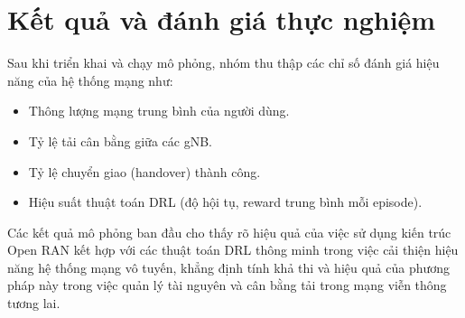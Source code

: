 \section{Kết quả và đánh giá thực nghiệm}

Sau khi triển khai và chạy mô phỏng, nhóm thu thập các chỉ số đánh giá hiệu năng của hệ thống mạng như:

\begin{itemize}
    \item Thông lượng mạng trung bình của người dùng.
    \item Tỷ lệ tải cân bằng giữa các gNB.
    \item Tỷ lệ chuyển giao (handover) thành công.
    \item Hiệu suất thuật toán DRL (độ hội tụ, reward trung bình mỗi episode).
\end{itemize}


Các kết quả mô phỏng ban đầu cho thấy rõ hiệu quả của việc sử dụng kiến trúc Open RAN kết hợp với các thuật toán DRL thông minh trong việc cải thiện hiệu năng hệ thống mạng vô tuyến, khẳng định tính khả thi và hiệu quả của phương pháp này trong việc quản lý tài nguyên và cân bằng tải trong mạng viễn thông tương lai.